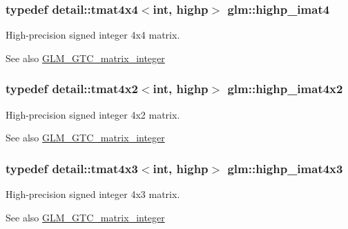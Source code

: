 \subsubsection[{\texorpdfstring{highp\+\_\+imat4}{highp_imat4}}]{\setlength{\rightskip}{0pt plus 5cm}typedef detail\+::tmat4x4$<$int, highp$>$ {\bf glm\+::highp\+\_\+imat4}}\hypertarget{group__gtc__matrix__integer_ga9ca2f5624891bd1ac993fcde4dd24ac1}{}\label{group__gtc__matrix__integer_ga9ca2f5624891bd1ac993fcde4dd24ac1}
High-\/precision signed integer 4x4 matrix. \begin{DoxySeeAlso}{See also}
\hyperlink{group__gtc__matrix__integer}{G\+L\+M\+\_\+\+G\+T\+C\+\_\+matrix\+\_\+integer} 
\end{DoxySeeAlso}
\subsubsection[{\texorpdfstring{highp\+\_\+imat4x2}{highp_imat4x2}}]{\setlength{\rightskip}{0pt plus 5cm}typedef detail\+::tmat4x2$<$int, highp$>$ {\bf glm\+::highp\+\_\+imat4x2}}\hypertarget{group__gtc__matrix__integer_gad998dce143f674a95a25241ff6e5e7d2}{}\label{group__gtc__matrix__integer_gad998dce143f674a95a25241ff6e5e7d2}
High-\/precision signed integer 4x2 matrix. \begin{DoxySeeAlso}{See also}
\hyperlink{group__gtc__matrix__integer}{G\+L\+M\+\_\+\+G\+T\+C\+\_\+matrix\+\_\+integer} 
\end{DoxySeeAlso}
\subsubsection[{\texorpdfstring{highp\+\_\+imat4x3}{highp_imat4x3}}]{\setlength{\rightskip}{0pt plus 5cm}typedef detail\+::tmat4x3$<$int, highp$>$ {\bf glm\+::highp\+\_\+imat4x3}}\hypertarget{group__gtc__matrix__integer_ga9d51b6f1c8cd0b23c6fcc8dca924b14c}{}\label{group__gtc__matrix__integer_ga9d51b6f1c8cd0b23c6fcc8dca924b14c}
High-\/precision signed integer 4x3 matrix. \begin{DoxySeeAlso}{See also}
\hyperlink{group__gtc__matrix__integer}{G\+L\+M\+\_\+\+G\+T\+C\+\_\+matrix\+\_\+integer} 
\end{DoxySeeAlso}
